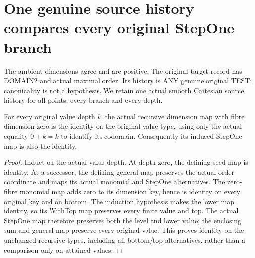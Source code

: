\section{One genuine source history compares every original StepOne branch}

The ambient dimensions agree and are positive. The original target record
has DOMAIN2 and actual maximal order. Its history is ANY genuine original
TEST; canonicality is not a hypothesis. We retain one actual smooth
Cartesian source history for all points, every branch and every depth.

\begin{lemma}
\label{hir:original-zero-fibre-value-maps-identity}
\leanok
For every original value depth $k$, the actual recursive dimension map
with fibre dimension zero is the identity on the original value type,
using only the actual equality $0+k=k$ to identify its codomain.
Consequently its induced StepOne map is also the identity.
\end{lemma}
\begin{proof}
Induct on the actual value depth. At depth zero, the defining seed map is
identity. At a successor, the defining general map preserves the actual
order coordinate and maps its actual monomial and StepOne alternatives.
The zero-fibre monomial map adds zero to its dimension key, hence is
identity on every original key and on bottom. The induction hypothesis
makes the lower map identity, so its WithTop map preserves every finite
value and top. The actual StepOne map therefore preserves both the level
and lower value; the enclosing sum and general map preserve every original
value. This proves identity on the unchanged recursive types, including
all bottom/top alternatives, rather than a comparison only on attained
values.
\end{proof}

